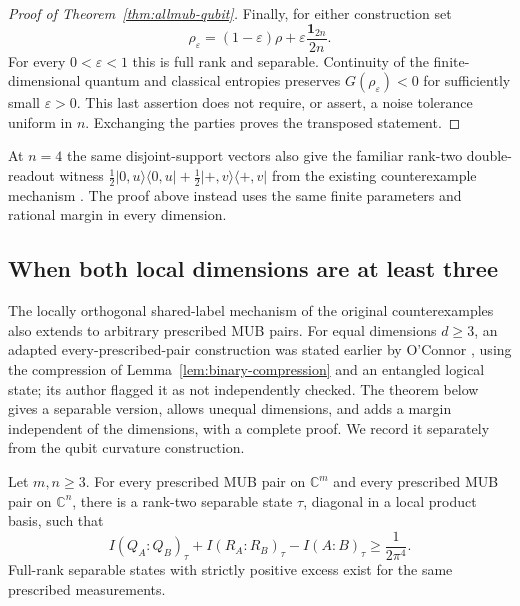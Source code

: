\begin{proof}[Proof of Theorem~\ref{thm:allmub-qubit}]
 Finally, for either construction set
 \[
  \rho_\varepsilon=(1-\varepsilon)\rho
                  +\varepsilon\frac{\mathbf1_{2n}}{2n}.
 \]
 For every $0<\varepsilon<1$ this is full rank and separable.
 Continuity of the finite-dimensional quantum and classical entropies
 preserves $G(\rho_\varepsilon)<0$ for sufficiently small
 $\varepsilon>0$.  This last assertion does not require, or assert, a
 noise tolerance uniform in $n$.  Exchanging the parties proves the
 transposed statement.
\end{proof}

At $n=4$ the same disjoint-support vectors also give the familiar
rank-two double-readout witness
$\tfrac12|0,u\rangle\langle0,u|+
\tfrac12|+,v\rangle\langle+,v|$ from the existing counterexample
mechanism \cite[Appendix~A.3]{qian}.  The proof above instead uses
the same finite parameters and rational margin in every dimension.

\subsection{When both local dimensions are at least three}

The locally orthogonal shared-label mechanism of the original
counterexamples \cite{wangcounter,qian} also extends to arbitrary
prescribed MUB pairs.  For equal dimensions $d\geq3$, an adapted
every-prescribed-pair construction was stated earlier by O'Connor
\cite{oconnor}, using the compression of
Lemma~\ref{lem:binary-compression} and an entangled logical state; its
author flagged it as not independently checked.  The theorem below
gives a separable version, allows unequal dimensions, and adds a
margin independent of the dimensions, with a complete proof.  We
record it separately from the qubit curvature construction.

\begin{theorem}
\label{thm:allmub-higher}
 Let $m,n\geq3$.  For every prescribed MUB pair on $\mathbb C^m$
 and every prescribed MUB pair on $\mathbb C^n$, there is a
 rank-two separable state $\tau$, diagonal in a local product basis,
 such that
 \begin{equation}
  I(Q_A:Q_B)_\tau+I(R_A:R_B)_\tau-I(A:B)_\tau
  \geq\frac1{2\pi^4}.
  \label{eq:higher-uniform-gap}
 \end{equation}
 Full-rank separable states with strictly positive excess exist for
 the same prescribed measurements.
\end{theorem}

